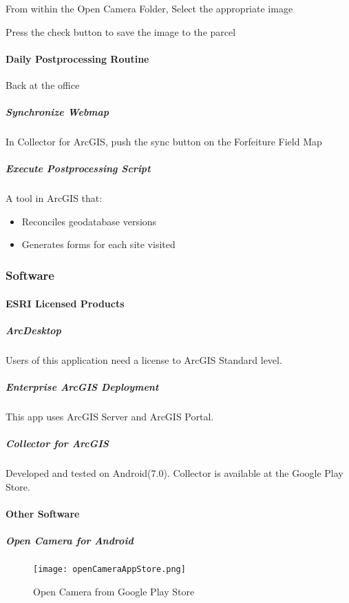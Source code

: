 \documentclass[class=article , crop=false, titlepage, twoside, multi={itemize, figure, verbatim}, float=false]{standalone}
\begin{document}
\noindent From within the Open Camera Folder, Select the appropriate image
\vspace{2in}

\noindent Press the check button to save the image to the parcel 

\clearpage
\paragraph{Daily Postprocessing Routine}Back at the office
\subparagraph{Synchronize Webmap}In Collector for ArcGIS, push the sync button on the Forfeiture Field Map
\subparagraph{Execute Postprocessing Script}A tool in ArcGIS that:

\begin{itemize}
\item Reconciles geodatabase versions
\item Generates forms for each site visited


\end{itemize}

\clearpage
\subsubsection{Software}
\paragraph{ESRI Licensed Products}
\subparagraph{ArcDesktop}Users of this application need a license to ArcGIS Standard level.

\subparagraph{Enterprise ArcGIS Deployment}This app uses ArcGIS Server and ArcGIS Portal.

\subparagraph{Collector for ArcGIS}Developed and tested on Android(7.0).  Collector is available at the Google Play Store.

\paragraph{Other Software}

\subparagraph{Open Camera for Android}

\begin{figure}[h!]
\centering
    \texttt{[image: openCameraAppStore.png]}
\caption{Open Camera from Google Play Store}
\end{figure}
\end{document}
